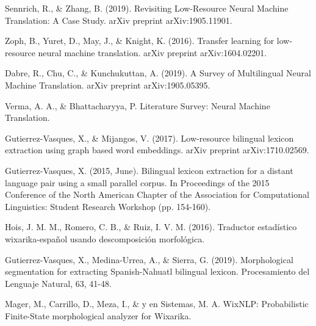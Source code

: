 \documentclass[12pt,twocolumn, letterpaper]{article}
\begin{document}
\begin{thebibliography}{1}

Sennrich, R., \& Zhang, B. (2019). Revisiting Low-Resource Neural Machine Translation: A Case Study. arXiv preprint arXiv:1905.11901.

Zoph, B., Yuret, D., May, J., \& Knight, K. (2016). Transfer learning for low-resource neural machine translation. arXiv preprint arXiv:1604.02201.

Dabre, R., Chu, C., \& Kunchukuttan, A. (2019). A Survey of Multilingual Neural Machine Translation. arXiv preprint arXiv:1905.05395.

Verma, A. A., \& Bhattacharyya, P. Literature Survey: Neural Machine Translation.

Gutierrez-Vasques, X., \& Mijangos, V. (2017). Low-resource bilingual lexicon extraction using graph based word embeddings. arXiv preprint arXiv:1710.02569.

Gutierrez-Vasques, X. (2015, June). Bilingual lexicon extraction for a distant language pair using a small parallel corpus. In Proceedings of the 2015 Conference of the North American Chapter of the Association for Computational Linguistics: Student Research Workshop (pp. 154-160).

Hois, J. M. M., Romero, C. B., \& Ruiz, I. V. M. (2016). Traductor estadístico wixarika-español usando descomposición morfológica.

Gutierrez-Vasques, X., Medina-Urrea, A., \& Sierra, G. (2019). Morphological segmentation for extracting Spanish-Nahuatl bilingual lexicon. Procesamiento del Lenguaje Natural, 63, 41-48.

Mager, M., Carrillo, D., Meza, I., \& y en Sistemas, M. A. WixNLP: Probabilistic Finite-State morphological analyzer for Wixarika.

\end{thebibliography}
\end{document}
